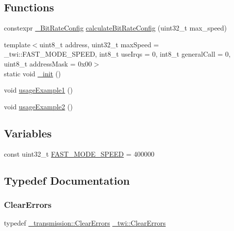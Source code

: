 \subsection*{Functions}
\begin{DoxyCompactItemize}
\item 
constexpr \hyperlink{struct__twi_1_1__BitRateConfig}{\+\_\+\+Bit\+Rate\+Config} \hyperlink{namespace__twi_ac0eaf0acb1c59c94a82785cebf218fa4}{calculate\+Bit\+Rate\+Config} (uint32\+\_\+t max\+\_\+speed)
\item 
{\footnotesize template$<$uint8\+\_\+t address, uint32\+\_\+t max\+Speed = \+\_\+twi\+::\+F\+A\+S\+T\+\_\+\+M\+O\+D\+E\+\_\+\+S\+P\+E\+ED, int8\+\_\+t use\+Irqs = 0, int8\+\_\+t general\+Call = 0, uint8\+\_\+t address\+Mask = 0x00$>$ }\\static void \hyperlink{namespace__twi_aa8cdb79f8922f74622428ff54a50b568}{\+\_\+init} ()
\item 
void \hyperlink{namespace__twi_a94dc1b0e503371a6986c795e510c6d46}{usage\+Example1} ()
\item 
void \hyperlink{namespace__twi_a5456b34a1718df6a3be53c87a3067aea}{usage\+Example2} ()
\end{DoxyCompactItemize}
\subsection*{Variables}
\begin{DoxyCompactItemize}
\item 
const uint32\+\_\+t \hyperlink{namespace__twi_aab54acbb0fdd75e47c23e8dc3344f02e}{F\+A\+S\+T\+\_\+\+M\+O\+D\+E\+\_\+\+S\+P\+E\+ED} = 400000
\end{DoxyCompactItemize}


\subsection{Typedef Documentation}
\hypertarget{namespace__twi_aa8eb8d45cab75978982349de4e9780f9}{}\label{namespace__twi_aa8eb8d45cab75978982349de4e9780f9} 
\subsubsection{\texorpdfstring{Clear\+Errors}{ClearErrors}}
{\footnotesize\ttfamily typedef \hyperlink{class__transmission_1_1ClearErrors}{\+\_\+transmission\+::\+Clear\+Errors} \hyperlink{namespace__twi_aa8eb8d45cab75978982349de4e9780f9}{\+\_\+twi\+::\+Clear\+Errors}}

